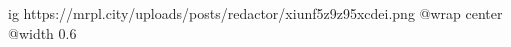  
 
 
 
 

\ifcmt
  ig https://mrpl.city/uploads/posts/redactor/xiunf5z9z95xcdei.png
  @wrap center
  @width 0.6
\fi
